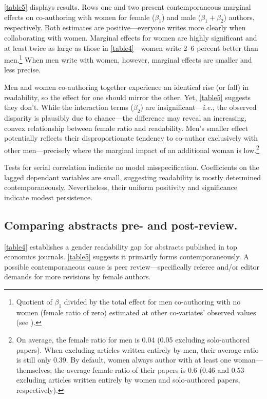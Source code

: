 

\autoref{table5} displays results. Rows one and two present contemporaneous marginal effects on co-authoring with women for female ($\beta_1$) and male ($\beta_1+\beta_2$) authors, respectively. Both estimates are positive---everyone writes more clearly when collaborating with women. Marginal effects for women are highly significant and at least twice as large as those in \autoref{table4}---women write 2--6 percent better than men.\footnote{Quotient of $\beta_1$ divided by the total effect for men co-authoring with no women (female ratio of zero) estimated at other co-variates' observed values (see ).} When men write with women, however, marginal effects are smaller and less precise.

Men and women co-authoring together experience an identical rise (or fall) in readability, so the effect for one should mirror the other. Yet, \autoref{table5} suggests they don't. While the interaction terms ($\beta_2$) are insignificant---\emph{i.e.}, the observed disparity is plausibly due to chance---the difference may reveal an increasing, convex relationship between female ratio and readability. Men's smaller effect potentially reflects their disproportionate tendency to co-author exclusively with other men---precisely where the marginal impact of an additional woman is low.\footnote{On average, the female ratio for men is 0.04 (0.05 excluding solo-authored papers). When excluding articles written entirely by men, their average ratio is still only 0.39. By default, women always author with at least one woman---themselves; the average female ratio of their papers is 0.6 (0.46 and 0.53 excluding articles written entirely by women and solo-authored papers, respectively).}

Tests for serial correlation indicate no model misspecification. Coefficients on the lagged dependant variables are small, suggesting readability is mostly determined contemporaneously. Nevertheless, their uniform positivity and significance indicate modest persistence.

\subsection{Comparing abstracts pre- and post-review.}
\label{nber}

\autoref{table4} establishes a gender readability gap for abstracts published in top economics journals. \autoref{table5} suggests it primarily forms contemporaneously. A possible contemporaneous cause is peer review---specifically referee and\slash or editor demands for more revisions by female authors.

